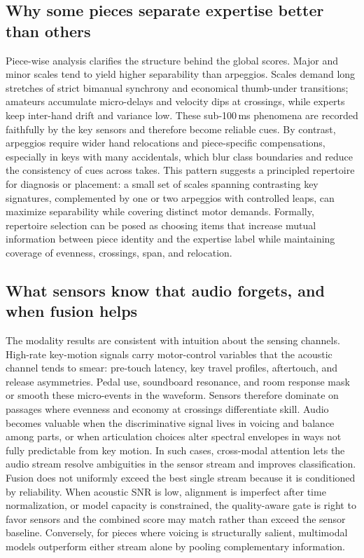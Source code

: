 \documentclass[sigconf,review,anonymous]{acmart}
\begin{document}
\subsection{Why some pieces separate expertise better than others}
Piece-wise analysis clarifies the structure behind the global scores. Major and minor scales tend to yield higher separability than arpeggios. Scales demand long stretches of strict bimanual synchrony and economical thumb-under transitions; amateurs accumulate micro-delays and velocity dips at crossings, while experts keep inter-hand drift and variance low. These sub-100\,ms phenomena are recorded faithfully by the key sensors and therefore become reliable cues. By contrast, arpeggios require wider hand relocations and piece-specific compensations, especially in keys with many accidentals, which blur class boundaries and reduce the consistency of cues across takes. This pattern suggests a principled repertoire for diagnosis or placement: a small set of scales spanning contrasting key signatures, complemented by one or two arpeggios with controlled leaps, can maximize separability while covering distinct motor demands. Formally, repertoire selection can be posed as choosing items that increase mutual information between piece identity and the expertise label while maintaining coverage of evenness, crossings, span, and relocation.

\subsection{What sensors know that audio forgets, and when fusion helps}
The modality results are consistent with intuition about the sensing channels. High-rate key-motion signals carry motor-control variables that the acoustic channel tends to smear: pre-touch latency, key travel profiles, aftertouch, and release asymmetries. Pedal use, soundboard resonance, and room response mask or smooth these micro-events in the waveform. Sensors therefore dominate on passages where evenness and economy at crossings differentiate skill. Audio becomes valuable when the discriminative signal lives in voicing and balance among parts, or when articulation choices alter spectral envelopes in ways not fully predictable from key motion. In such cases, cross-modal attention lets the audio stream resolve ambiguities in the sensor stream and improves classification. Fusion does not uniformly exceed the best single stream because it is conditioned by reliability. When acoustic SNR is low, alignment is imperfect after time normalization, or model capacity is constrained, the quality-aware gate is right to favor sensors and the combined score may match rather than exceed the sensor baseline. Conversely, for pieces where voicing is structurally salient, multimodal models outperform either stream alone by pooling complementary information.
\end{document}
